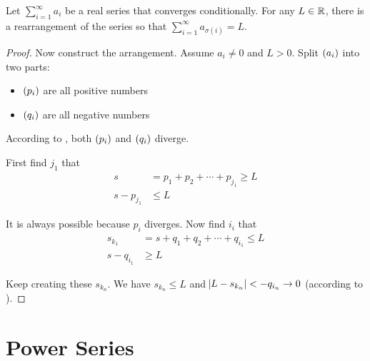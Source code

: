 \begin{theorem}
    Let $\sum_{i=1}^\infty a_i$ be a real series that converges conditionally. For any $L \in \mathbb{R}$, there is a rearrangement of the series so that $\sum_{i=1}^\infty a_{\sigma (i)} = L$.
\end{theorem}
\begin{proof}
    
    Now construct the arrangement. Assume $a_i \neq 0$ and $L > 0$. Split $\sequence{a_i}$ into two parts:
    \begin{itemize}
        \item $\sequence{p_i}$ are all positive numbers
        \item $\sequence{q_i}$ are all negative numbers
    \end{itemize}
    
    According to , both $\sequence{p_i}$ and $\sequence{q_i}$ diverge. 
    
    First find $j_1$ that
    \begin{equation*}
        \begin{aligned}
            s &= p_1 + p_2 + \cdots + p_{j_1} \geq L \\
            s - p_{j_1} &\leq L
        \end{aligned}
    \end{equation*}
    
    It is always possible because $p_i$ diverges. Now find $i_i$ that
    \begin{equation*}
        \begin{aligned}
            s_{k_1} &= s + q_1 + q_2 + \cdots + q_{i_1} \leq L \\
            s - q_{i_1} &\geq L
        \end{aligned}
    \end{equation*}
    
    Keep creating these $s_{k_n}$. We have $s_{k_n} \leq L$ and $\abs{L - s_{k_n}} < - q_{i_n} \rightarrow 0$ (according to ).
\end{proof}






\section{Power Series}

